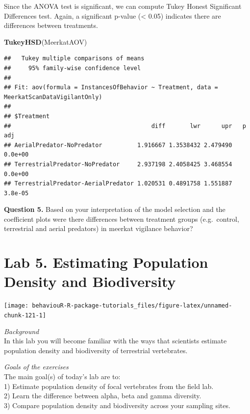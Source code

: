\documentclass[]{book}
\newenvironment{Shaded}{\begin{snugshade}}{\end{snugshade}}
\newcommand{\KeywordTok}[1]{\textcolor[rgb]{0.13,0.29,0.53}{\textbf{#1}}}
\newcommand{\NormalTok}[1]{#1}
\begin{document}
Since the ANOVA test is significant, we can compute Tukey Honest Significant Differences test. Again, a significant p-value (\textless{} 0.05) indicates there are differences between treatments.

\begin{Shaded}
\begin{Highlighting}[]
\KeywordTok{TukeyHSD}\NormalTok{(MeerkatAOV)}
\end{Highlighting}
\end{Shaded}

\begin{verbatim}
##   Tukey multiple comparisons of means
##     95% family-wise confidence level
## 
## Fit: aov(formula = InstancesOfBehavior ~ Treatment, data = MeerkatScanDataVigilantOnly)
## 
## $Treatment
##                                        diff       lwr      upr   p adj
## AerialPredator-NoPredator          1.916667 1.3538432 2.479490 0.0e+00
## TerrestrialPredator-NoPredator     2.937198 2.4058425 3.468554 0.0e+00
## TerrestrialPredator-AerialPredator 1.020531 0.4891758 1.551887 3.8e-05
\end{verbatim}

\textbf{Question 5.} Based on your interpretation of the model selection and the coefficient plots were there differences between treatment groups (e.g.~control, terrestrial and aerial predators) in meerkat vigilance behavior?

\hypertarget{lab-5.-estimating-population-density-and-biodiversity}{%
\chapter{Lab 5. Estimating Population Density and Biodiversity}\label{lab-5.-estimating-population-density-and-biodiversity}}

\begin{center}\texttt{[image: behaviouR-R-package-tutorials\_files/figure-latex/unnamed-chunk-121-1]} \end{center}

\emph{Background}\\
In this lab you will become familiar with the ways that scientists estimate population density and biodiversity of terrestrial vertebrates.

\emph{Goals of the exercises}\\
The main goal(s) of today's lab are to:\\
1) Estimate population density of focal vertebrates from the field lab.\\
2) Learn the difference between alpha, beta and gamma diversity.\\
3) Compare population density and biodiversity across your sampling sites.
\end{document}
